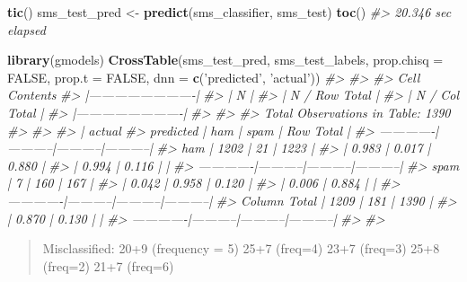 \documentclass[]{book}
\newenvironment{Shaded}{\begin{snugshade}}{\end{snugshade}}
\newcommand{\CommentTok}[1]{\textcolor[rgb]{0.56,0.35,0.01}{\textit{#1}}}
\newcommand{\DataTypeTok}[1]{\textcolor[rgb]{0.13,0.29,0.53}{#1}}
\newcommand{\KeywordTok}[1]{\textcolor[rgb]{0.13,0.29,0.53}{\textbf{#1}}}
\newcommand{\NormalTok}[1]{#1}
\newcommand{\OtherTok}[1]{\textcolor[rgb]{0.56,0.35,0.01}{#1}}
\newcommand{\StringTok}[1]{\textcolor[rgb]{0.31,0.60,0.02}{#1}}
\begin{document}
\begin{Shaded}
\begin{Highlighting}[]
\KeywordTok{tic}\NormalTok{()}
\NormalTok{sms_test_pred <-}\StringTok{ }\KeywordTok{predict}\NormalTok{(sms_classifier, sms_test)}
\KeywordTok{toc}\NormalTok{()}
\CommentTok{#> 20.346 sec elapsed}
\end{Highlighting}
\end{Shaded}

\begin{Shaded}
\begin{Highlighting}[]
\KeywordTok{library}\NormalTok{(gmodels)}
\KeywordTok{CrossTable}\NormalTok{(sms_test_pred, sms_test_labels,}
    \DataTypeTok{prop.chisq =} \OtherTok{FALSE}\NormalTok{, }\DataTypeTok{prop.t =} \OtherTok{FALSE}\NormalTok{,}
    \DataTypeTok{dnn =} \KeywordTok{c}\NormalTok{(}\StringTok{'predicted'}\NormalTok{, }\StringTok{'actual'}\NormalTok{))}
\CommentTok{#> }
\CommentTok{#>  }
\CommentTok{#>    Cell Contents}
\CommentTok{#> |-------------------------|}
\CommentTok{#> |                       N |}
\CommentTok{#> |           N / Row Total |}
\CommentTok{#> |           N / Col Total |}
\CommentTok{#> |-------------------------|}
\CommentTok{#> }
\CommentTok{#>  }
\CommentTok{#> Total Observations in Table:  1390 }
\CommentTok{#> }
\CommentTok{#>  }
\CommentTok{#>              | actual }
\CommentTok{#>    predicted |       ham |      spam | Row Total | }
\CommentTok{#> -------------|-----------|-----------|-----------|}
\CommentTok{#>          ham |      1202 |        21 |      1223 | }
\CommentTok{#>              |     0.983 |     0.017 |     0.880 | }
\CommentTok{#>              |     0.994 |     0.116 |           | }
\CommentTok{#> -------------|-----------|-----------|-----------|}
\CommentTok{#>         spam |         7 |       160 |       167 | }
\CommentTok{#>              |     0.042 |     0.958 |     0.120 | }
\CommentTok{#>              |     0.006 |     0.884 |           | }
\CommentTok{#> -------------|-----------|-----------|-----------|}
\CommentTok{#> Column Total |      1209 |       181 |      1390 | }
\CommentTok{#>              |     0.870 |     0.130 |           | }
\CommentTok{#> -------------|-----------|-----------|-----------|}
\CommentTok{#> }
\CommentTok{#> }
\end{Highlighting}
\end{Shaded}

\begin{quote}
Misclassified:
20+9 (frequency = 5)
25+7 (freq=4)
23+7 (freq=3)
25+8 (freq=2)
21+7 (freq=6)
\end{quote}
\end{document}
